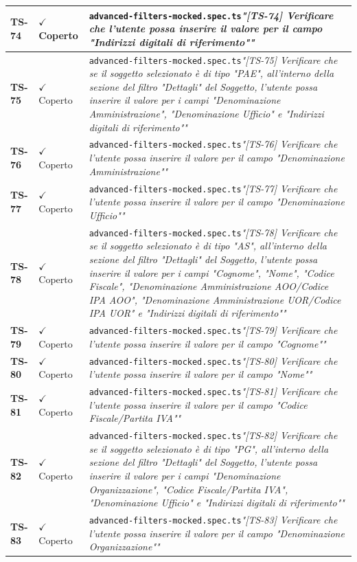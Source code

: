 \documentclass[a4paper,12pt]{article}
\newcommand{\ok}{\textcolor{green!60!black}{$\checkmark$ Coperto}}
\newcommand{\f}[1]{\nolinkurl{#1}\newline}
\newcommand{\q}[1]{\textit{#1}}
\begin{document}
\begin{longtable}{|p{1.5cm}|p{3.0cm}|p{10.5cm}|}
\textbf{TS-74} & \ok & \f{advanced-filters-mocked.spec.ts}\q{"[TS-74] Verificare che l'utente possa inserire il valore per il campo "Indirizzi digitali di riferimento""} \\ \hline
\textbf{TS-75} & \ok & \f{advanced-filters-mocked.spec.ts}\q{"[TS-75] Verificare che se il soggetto selezionato è di tipo "PAE", all'interno della sezione del filtro "Dettagli" del Soggetto, l'utente possa inserire il valore per i campi "Denominazione Amministrazione", "Denominazione Ufficio" e "Indirizzi digitali di riferimento""} \\ \hline
\textbf{TS-76} & \ok & \f{advanced-filters-mocked.spec.ts}\q{"[TS-76] Verificare che l'utente possa inserire il valore per il campo "Denominazione Amministrazione""} \\ \hline
\textbf{TS-77} & \ok & \f{advanced-filters-mocked.spec.ts}\q{"[TS-77] Verificare che l'utente possa inserire il valore per il campo "Denominazione Ufficio""} \\ \hline
\textbf{TS-78} & \ok & \f{advanced-filters-mocked.spec.ts}\q{"[TS-78] Verificare che se il soggetto selezionato è di tipo "AS", all'interno della sezione del filtro "Dettagli" del Soggetto, l'utente possa inserire il valore per i campi "Cognome", "Nome", "Codice Fiscale", "Denominazione Amministrazione AOO/Codice IPA AOO", "Denominazione Amministrazione UOR/Codice IPA UOR" e "Indirizzi digitali di riferimento""} \\ \hline
\textbf{TS-79} & \ok & \f{advanced-filters-mocked.spec.ts}\q{"[TS-79] Verificare che l'utente possa inserire il valore per il campo "Cognome""} \\ \hline
\textbf{TS-80} & \ok & \f{advanced-filters-mocked.spec.ts}\q{"[TS-80] Verificare che l'utente possa inserire il valore per il campo "Nome""} \\ \hline
\textbf{TS-81} & \ok & \f{advanced-filters-mocked.spec.ts}\q{"[TS-81] Verificare che l'utente possa inserire il valore per il campo "Codice Fiscale/Partita IVA""} \\ \hline
\textbf{TS-82} & \ok & \f{advanced-filters-mocked.spec.ts}\q{"[TS-82] Verificare che se il soggetto selezionato è di tipo "PG", all'interno della sezione del filtro "Dettagli" del Soggetto, l'utente possa inserire il valore per i campi "Denominazione Organizzazione", "Codice Fiscale/Partita IVA", "Denominazione Ufficio" e "Indirizzi digitali di riferimento""} \\ \hline
\textbf{TS-83} & \ok & \f{advanced-filters-mocked.spec.ts}\q{"[TS-83] Verificare che l'utente possa inserire il valore per il campo "Denominazione Organizzazione""} \\ \hline

\end{longtable}
\end{document}
